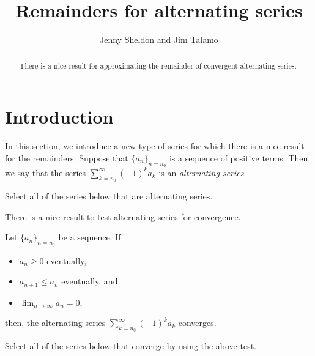 \documentclass{ximera}
\title[Dig-In:]{Remainders for alternating series}
\author{Jenny Sheldon and Jim Talamo}
\begin{document}
\begin{abstract}
There is a nice result for approximating the remainder of convergent alternating series. 
\end{abstract}
\maketitle

\section{Introduction}
In this section, we introduce a new type of series for which there is a nice result for the remainders.  Suppose that $\{a_n\}_{n=n_0}$ is a sequence of positive terms.  Then, we say that the series $\sum_{k=n_0}^{\infty} (-1)^k a_k$ is an \emph{alternating series}.

\begin{question}
Select all of the series below that are alternating series.

\begin{selectAll}
\end{selectAll}
\end{question}

There is a nice result to test alternating series for convergence.

\begin{theorem}
Let $\{a_n\}_{n=n_0}$ be a sequence.  If

\begin{itemize}
\item $a_n \geq 0$ eventually,
\item $a_{n+1} \leq a_n$ eventually, and
\item $\lim_{n \to \infty} a_n=0$, 
\end{itemize}

then, the alternating series $\sum_{k=n_0}^\infty (-1)^{k}a_k$ converges.
\end{theorem}

\begin{question}
Select all of the series below that converge by using the above test.

\begin{selectAll}
\end{selectAll}
\end{question}
\end{document}
